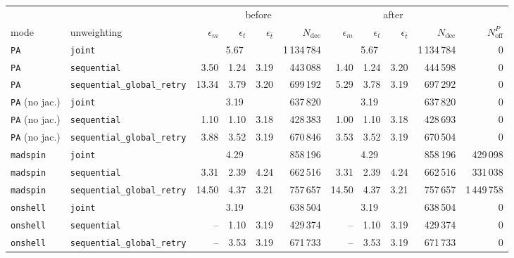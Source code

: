 \begin{table}[htbp]
  \centering
  \small
  \begin{tabular}{ll rrrr rrrr r}
    \toprule
    & & \multicolumn{4}{c}{before} & \multicolumn{4}{c}{after} & \\
    \cmidrule(lr){3-6} \cmidrule(lr){7-10}
    mode & unweighting & $\epsilon_m$ & $\epsilon_t$ & $\epsilon_{\bar t}$ & $N_{\mathrm{dec}}$ & $\epsilon_m$ & $\epsilon_t$ & $\epsilon_{\bar t}$ & $N_{\mathrm{dec}}$ & $N^P_{\mathrm{off}}$ \\
    \midrule
    \texttt{PA} & \texttt{joint} & \multicolumn{3}{c}{5.67} & 1\,134\,784 & \multicolumn{3}{c}{5.67} & 1\,134\,784 & 0 \\
    \texttt{PA} & \texttt{sequential} & 3.50 & 1.24 & 3.19 & 443\,088 & 1.40 & 1.24 & 3.20 & 444\,598 & 0 \\
    \texttt{PA} & \texttt{sequential\_global\_retry} & 13.34 & 3.79 & 3.20 & 699\,192 & 5.29 & 3.78 & 3.19 & 697\,292 & 0 \\
    \midrule
    \texttt{PA} (no jac.) & \texttt{joint} & \multicolumn{3}{c}{3.19} & 637\,820 & \multicolumn{3}{c}{3.19} & 637\,820 & 0 \\
    \texttt{PA} (no jac.) & \texttt{sequential} & 1.10 & 1.10 & 3.18 & 428\,383 & 1.00 & 1.10 & 3.18 & 428\,693 & 0 \\
    \texttt{PA} (no jac.) & \texttt{sequential\_global\_retry} & 3.88 & 3.52 & 3.19 & 670\,846 & 3.53 & 3.52 & 3.19 & 670\,504 & 0 \\
    \midrule
    \texttt{madspin} & \texttt{joint} & \multicolumn{3}{c}{4.29} & 858\,196 & \multicolumn{3}{c}{4.29} & 858\,196 & 429\,098 \\
    \texttt{madspin} & \texttt{sequential} & 3.31 & 2.39 & 4.24 & 662\,516 & 3.31 & 2.39 & 4.24 & 662\,516 & 331\,038 \\
    \texttt{madspin} & \texttt{sequential\_global\_retry} & 14.50 & 4.37 & 3.21 & 757\,657 & 14.50 & 4.37 & 3.21 & 757\,657 & 1\,449\,758 \\
    \midrule
    \texttt{onshell} & \texttt{joint} & \multicolumn{3}{c}{3.19} & 638\,504 & \multicolumn{3}{c}{3.19} & 638\,504 & 0 \\
    \texttt{onshell} & \texttt{sequential} & -- & 1.10 & 3.19 & 429\,374 & -- & 1.10 & 3.19 & 429\,374 & 0 \\
    \texttt{onshell} & \texttt{sequential\_global\_retry} & -- & 3.53 & 3.19 & 671\,733 & -- & 3.53 & 3.19 & 671\,733 & 0 \\
    \bottomrule
  \end{tabular}

\end{table}
